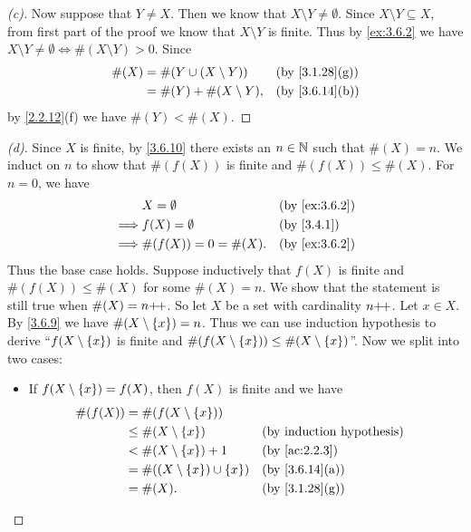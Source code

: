 \begin{proof}[(c)]
	Now suppose that \(Y \neq X\).
	Then we know that \(X \setminus Y \neq \emptyset\).
	Since \(X \setminus Y \subseteq X\), from first part of the proof we know that \(X \setminus Y\) is finite.
	Thus by \cref{ex:3.6.2} we have \(X \setminus Y \neq \emptyset \iff \#(X \setminus Y) > 0\).
	Since
	\begin{align*}
		\#(X) & = \#(Y \cup (X \setminus Y)) &  & \by{3.1.28}[g] \\
		      & = \#(Y) + \#(X \setminus Y), &  & \by{3.6.14}[b]
	\end{align*}
	by \cref{2.2.12}(f) we have \(\#(Y) < \#(X)\).
\end{proof}

\begin{proof}[(d)]
	Since \(X\) is finite, by \cref{3.6.10} there exists an \(n \in \mathbb{N}\) such that \(\#(X) = n\).
	We induct on \(n\) to show that \(\#(f(X))\) is finite and \(\#(f(X)) \leq \#(X)\).
	For \(n = 0\), we have
	\begin{align*}
		         & X = \emptyset         &  & \by{ex:3.6.2} \\
		\implies & f(X) = \emptyset      &  & \by{3.4.1}    \\
		\implies & \#(f(X)) = 0 = \#(X). &  & \by{ex:3.6.2}
	\end{align*}
	Thus the base case holds.
	Suppose inductively that \(f(X)\) is finite and \(\#(f(X)) \leq \#(X)\) for some \(\#(X) = n\).
	We show that the statement is still true when \(\#(X) = n{+}\!{+}\).
	So let \(X\) be a set with cardinality \(n{+}\!{+}\).
	Let \(x \in X\).
	By \cref{3.6.9} we have \(\#(X \setminus \left\lbrace x\right\rbrace) = n\).
	Thus we can use induction hypothesis to derive ``\(f(X \setminus \left\lbrace x\right\rbrace)\) is finite and \(\#(f(X \setminus \left\lbrace x\right\rbrace)) \leq \#(X \setminus \left\lbrace x\right\rbrace)\)''.
	Now we split into two cases:
	\begin{itemize}
		\item If \(f(X \setminus \left\lbrace x\right\rbrace) = f(X)\), then \(f(X)\) is finite and we have
		      \begin{align*}
			      \#(f(X)) & = \#(f(X \setminus \set{x}))                                 \\
			               & \leq \#(X \setminus \set{x})             &  & \byIH          \\
			               & < \#(X \setminus \set{x}) + 1            &  & \by{ac:2.2.3}  \\
			               & = \#((X \setminus \set{x}) \cup \set{x}) &  & \by{3.6.14}[a] \\
			               & = \#(X).                                 &  & \by{3.1.28}[g]

\end{align*}
\end{itemize}
\end{proof}
